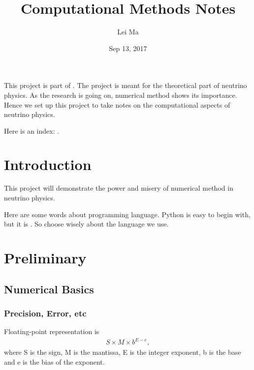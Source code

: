 \documentclass[letterpaper,12pt,english]{sphinxmanual}
\title{Computational Methods Notes}
\date{Sep 13, 2017}
\author{Lei Ma}
\begin{document}
\maketitle
\sphinxtableofcontents
{}\label{\detokenize{index::doc}}


This project is part of  . The project  is meant for the theoretical part of neutrino physics. As the research is going on, numerical method shows its importance. Hence we set up this project to take notes on the computational aspects of neutrino physics.
\begin{figure}[htbp]
\centering
{}\end{figure}

Here is an index:  .


\chapter{Introduction}
\label{\detokenize{intro::doc}}\label{\detokenize{intro:computational-neutrino-physics}}\label{\detokenize{intro:introduction}}
This project will demonstrate the power and misery of numerical method in neutrino physics.

Here are some words about programming language. Python is easy to begin with, but it is . So choose wisely about the language we use.


\chapter{Preliminary}
\label{\detokenize{preliminary/index::doc}}\label{\detokenize{preliminary/index:preliminary}}

\section{Numerical Basics}
\label{\detokenize{preliminary/numerical-basics::doc}}\label{\detokenize{preliminary/numerical-basics:numerical-basics}}

\subsection{Precision, Error, etc}
\label{\detokenize{preliminary/numerical-basics:precision-error-etc}}
Floating-point representation is
\begin{equation*}
\begin{split}S\times M \times b^{E-e},\end{split}
\end{equation*}
where S is the sign, M is the mantissa, E is the integer exponent, b is the base and e is the bias of the exponent.
\end{document}
